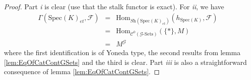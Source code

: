 \begin{proof}
Part {\it i} is clear (use that the stalk functor is exact). For {\it ii}, we 
have 
\begin{eqnarray*}
\Gamma(\text{Spec}(K)_{et}, \mathcal{F}) & = & 
\text{Hom}_{\textit{Sh}(\text{Spec}(K)_{et})}(h_{\text{Spec}(K)}, \mathcal{F}) 
\\
& = & \text{Hom}_{\mathcal{C}^0(\mathcal{G}\text{-Sets})}(\{*\}, M) \\
& = &  M^{\mathcal{G}}
\end{eqnarray*}
where the first identification is of Yoneda type, the second results from lemma 
\ref{lem:EqOfCatContGSets} and the third is clear. Part {\it iii} is also a 
straightforward consequence of lemma \ref{lem:EqOfCatContGSets}.
\end{proof}

